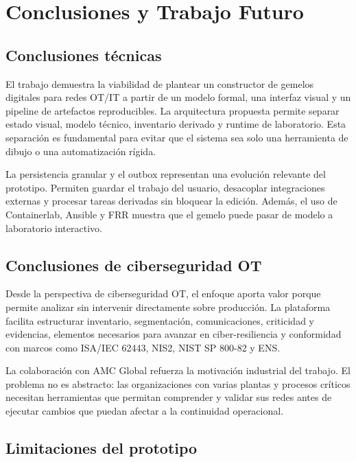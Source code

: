 \chapter{Conclusiones y Trabajo Futuro} \label{ch:conclusiones}

\section{Conclusiones técnicas} \label{sec:conclusiones-tecnicas}

El trabajo demuestra la viabilidad de plantear un constructor de gemelos digitales para redes OT/IT a partir de un modelo formal, una interfaz visual y un pipeline de artefactos reproducibles. La arquitectura propuesta permite separar estado visual, modelo técnico, inventario derivado y runtime de laboratorio. Esta separación es fundamental para evitar que el sistema sea solo una herramienta de dibujo o una automatización rígida.

La persistencia granular y el outbox representan una evolución relevante del prototipo. Permiten guardar el trabajo del usuario, desacoplar integraciones externas y procesar tareas derivadas sin bloquear la edición. Además, el uso de Containerlab, Ansible y FRR muestra que el gemelo puede pasar de modelo a laboratorio interactivo.

\section{Conclusiones de ciberseguridad OT} \label{sec:conclusiones-ot}

Desde la perspectiva de ciberseguridad OT, el enfoque aporta valor porque permite analizar sin intervenir directamente sobre producción. La plataforma facilita estructurar inventario, segmentación, comunicaciones, criticidad y evidencias, elementos necesarios para avanzar en ciber-resiliencia y conformidad con marcos como ISA/IEC 62443, NIS2, NIST SP 800-82 y ENS.

La colaboración con AMC Global refuerza la motivación industrial del trabajo. El problema no es abstracto: las organizaciones con varias plantas y procesos críticos necesitan herramientas que permitan comprender y validar sus redes antes de ejecutar cambios que puedan afectar a la continuidad operacional.

\section{Limitaciones del prototipo} \label{sec:limitaciones-prototipo}

